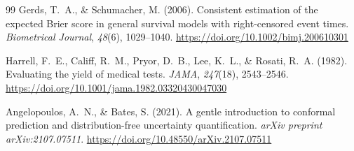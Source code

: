 \documentclass[preprint,12pt]{elsarticle}
\begin{document}
\begin{thebibliography}{99}
Gerds, T.~A., \& Schumacher, M. (2006). Consistent estimation of the expected Brier score in general survival models with right-censored event times. \textit{Biometrical Journal}, \textit{48}(6), 1029--1040. \url{https://doi.org/10.1002/bimj.200610301}

Harrell, F.~E., Califf, R.~M., Pryor, D.~B., Lee, K.~L., \& Rosati, R.~A. (1982). Evaluating the yield of medical tests. \textit{JAMA}, \textit{247}(18), 2543--2546. \url{https://doi.org/10.1001/jama.1982.03320430047030}

Angelopoulos, A.~N., \& Bates, S. (2021). A gentle introduction to conformal prediction and distribution-free uncertainty quantification. \textit{arXiv preprint arXiv:2107.07511}. \url{https://doi.org/10.48550/arXiv.2107.07511}

\end{thebibliography}
\end{document}
